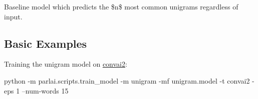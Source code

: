 Baseline model which predicts the \$n\$ most common unigrams regardless of input.

\subsection*{Basic Examples}

Training the unigram model on \hyperlink{namespaceconvai2}{convai2}\+:


\begin{DoxyCode}
python -m parlai.scripts.train\_model -m unigram -mf unigram.model -t convai2 -eps 1 --num-words 15
\end{DoxyCode}
 
